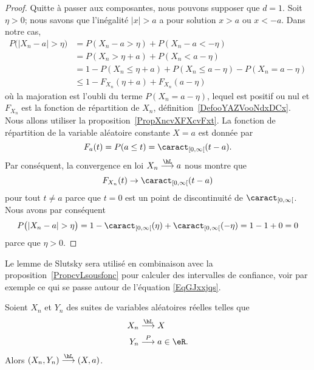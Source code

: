 \begin{proof}
	Quitte à passer aux composantes, nous pouvons supposer que \( d=1\). Soit \( \eta>0\); nous savons que l'inégalité \( | x |>a\) a pour solution \( x>a\) ou \( x<-a\). Dans notre cas,
	\begin{subequations}
		\begin{align}
			P\big( | X_n-a |>\eta \big) & =P(X_n-a>\eta)+P(X_n-a<-\eta)                        \\
			                            & =P(X_n>\eta+a)+P(X_n<a-\eta)                         \\
			                            & =1-P(X_n\leq \eta+a)+P(X_n\leq a-\eta)-P(X_n=a-\eta) \\
			                            & \leq 1-F_{X_n}(\eta+a)+F_{X_n}(a-\eta)
		\end{align}
	\end{subequations}
	où la majoration est l'oubli du terme \( P(X_n=a-\eta)\), lequel est positif ou nul et \( F_{X_n}\) est la fonction de répartition de \( X_n\), définition~\ref{DefooYAZVooNdxDCx}. Nous allons utiliser la proposition~\ref{PropXncvXFXcvFxt}. La fonction de répartition de la variable aléatoire constante \( X=a\) est donnée par
	\begin{equation}
		F_a(t)=P(a\leq t)=\caract_{\mathopen[ 0 , \infty \mathclose[}(t-a).
	\end{equation}
	Par conséquent, la convergence en loi \( X_n\stackrel{\hL}{\longrightarrow}a\) nous montre que
	\begin{equation}
		F_{X_n}(t)\to \caract_{\mathopen[ 0 , \infty \mathclose[}(t-a)
	\end{equation}
	pour tout \( t\neq a\) parce que \( t=0\) est un point de discontinuité de \( \caract_{\mathopen[ 0 , \infty \mathclose[}\). Nous avons par conséquent
	\begin{equation}
		P\big( | X_n-a |>\eta \big)=1-\caract_{\mathopen[ 0 , \infty \mathclose[}(\eta)+\caract_{\mathopen[ 0 , \infty \mathclose[}(-\eta)=1-1+0=0
	\end{equation}
	parce que \( \eta>0\).
\end{proof}

Le lemme de Slutsky sera utilisé en combinaison avec la proposition~\ref{PropcvLsousfonc} pour calculer des intervalles de confiance, voir par exemple ce qui se passe autour de l'équation \eqref{EqGJxxjqs}.
\begin{lemma}  \label{LemgXDlhs}
	Soient \( X_n\) et \( Y_n\) des suites de variables aléatoires réelles telles que
	\begin{equation}
		\begin{aligned}[]
			X_n & \stackrel{\hL}{\longrightarrow} X     \\
			Y_n & \stackrel{P}{\longrightarrow}a\in\eR.
		\end{aligned}
	\end{equation}
	Alors \( (X_n,Y_n)\stackrel{\hL}{\longrightarrow}(X,a)\).
\end{lemma}

